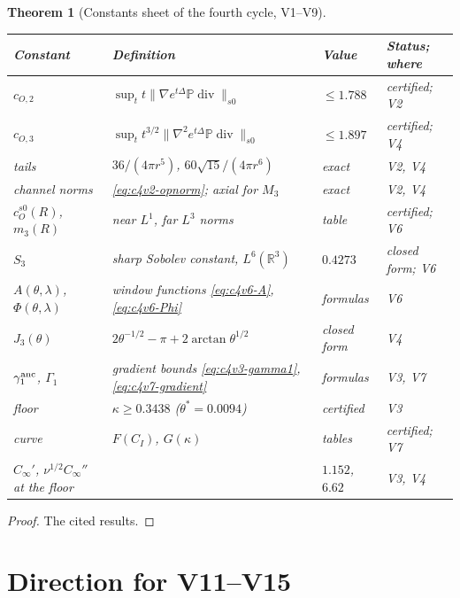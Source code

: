 \documentclass[11pt]{article}
\newcommand{\R}{\mathbb R}
\newcommand{\PP}{\mathbb P}
\theoremstyle{plain}
\newtheorem{theorem}{Theorem}[section]
\theoremstyle{definition}
\theoremstyle{remark}
\begin{document}
\begin{theorem}[Constants sheet of the fourth cycle, V1--V9]
\label{thm:c4v9-sheet}
\medskip
\begin{center}\small
\begin{tabular}{@{}p{}p{}p{}p{}@{}}
\toprule
\textbf{Constant} & \textbf{Definition} & \textbf{Value} & \textbf{Status; where}\\
\midrule
\(c_{O,2}\) & \(\sup_tt\|\nabla e^{t\Delta}\PP\operatorname{div}\|_{s0}\) & \(\le1.788\) & certified; V2\\
\(c_{O,3}\) & \(\sup_tt^{3/2}\|\nabla^2e^{t\Delta}\PP\operatorname{div}\|_{s0}\) & \(\le1.897\) & certified; V4\\
tails & \(36/(4\pi r^5)\), \(60\sqrt{15}/(4\pi r^6)\) & exact & V2, V4\\
channel norms & \eqref{eq:c4v2-opnorm}; axial for \(M_3\) & exact & V2, V4\\
\(c_O^{s0}(R)\), \(m_3(R)\) & near \(L^1\), far \(L^3\) norms & table & certified; V6\\
\(S_3\) & sharp Sobolev constant, \(L^6(\R^3)\) & \(0.4273\) & closed form; V6\\
\(A(\theta,\lambda)\), \(\Phi(\theta,\lambda)\) & window functions \eqref{eq:c4v6-A}, \eqref{eq:c4v6-Phi} & formulas & V6\\
\(J_3(\theta)\) & \(2\theta^{-1/2}-\pi+2\arctan\theta^{1/2}\) & closed form & V4\\
\(\gamma_1^{\rm anc}\), \(\Gamma_1\) & gradient bounds \eqref{eq:c4v3-gamma1}, \eqref{eq:c4v7-gradient} & formulas & V3, V7\\
floor & \(\kappa\ge0.3438\) (\(\theta^*=0.0094\)) & certified & V3\\
curve & \(F(C_I)\), \(G(\kappa)\) & tables & certified; V7\\
\(C_\infty'\), \(\nu^{1/2}C_\infty''\) at the floor & & \(1.152\), \(6.62\) & V3, V4\\
\bottomrule
\end{tabular}
\end{center}
\medskip
\end{theorem}

\begin{proof}
The cited results.
\end{proof}

\section{Direction for V11--V15}
\label{sec:c4v9-direction}
\end{document}
